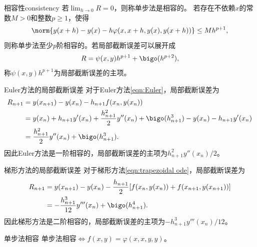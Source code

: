 \begin{definition}
    {相容性}{consistency}
    若$\lim_{h\to0}R=0$，则称单步法是相容的。
    \tcblower
    若存在不依赖$x$的常数$M>0$和整数$p\geq 1$，使得
    \begin{equation}
        \norm{y(x+h)-y(x)-h\varphi(x,x+h,y(x),y(x+h))}\leq Mh^{p+1},
    \end{equation}
    则称单步法至少$p$阶相容的。若局部截断误差可以展开成
    \[
        R=\psi(x,y)h^{p+1}+\bigo(h^{p+2}),
    \]
    称$\psi(x,y)h^{p+1}$为局部截断误差的主项。
\end{definition}

\begin{example}
    {Euler方法的局部截断误差}{}
    对于Euler方法\eqref{eqn:Euler}，局部截断误差为
    \begin{align*}
        R_{n+1}&=y(x_{n+1})-y(x_n)-h_{n+1}f(x_n,y(x_n))\\
        &=y(x_n)+h_{n+1}y'(x_n)+\frac{h_{n+1}^2}2y''(x_n)+\bigo(h_{n+1}^3)-y(x_n)-h_{n+1}y'(x_n)\\
        &=\frac{h_{n+1}^2}2y''(x_n)+\bigo(h_{n+1}^3).
    \end{align*}
    因此Euler方法是一阶相容的，局部截断误差的主项为$h_{n+1}^2y''(x_n)/2$。
\end{example}

\begin{example}
    {梯形方法的局部截断误差}{}
    对于梯形方法\eqref{eqn:trapezoidal ode}，局部截断误差为
    \begin{align*}
        R_{n+1}&=y(x_{n+1})-y(x_n)-\frac{h_{n+1}}2[f(x_n,y(x_n))+f(x_{n+1},y(x_{n+1}))]\\
        &=-\frac{h_{n+1}^3}{12}y'''(x_n)+\bigo(h_{n+1}^4).
    \end{align*}
    因此梯形方法是二阶相容的，局部截断误差的主项为$-h_{n+1}^3y'''(x_n)/12$。
\end{example}

\begin{theorem}
    {单步法相容}{}
    单步法相容$\iff f(x,y)=\varphi(x,x,y,y)$。
\end{theorem}

